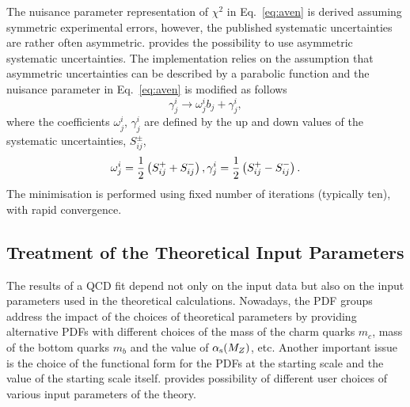 %
The nuisance parameter representation of $\chi^2$ in Eq.~\ref{eq:aven} is derived assuming 
symmetric experimental errors, however, the published systematic uncertainties are 
rather often asymmetric.
\fitter provides the possibility to use asymmetric systematic uncertainties.
The implementation relies on the assumption that 
asymmetric uncertainties can be described by a parabolic function
and the nuisance parameter in Eq.~\ref{eq:aven} is modified as follows
\begin{equation}
  \gamma^i_{j} \to \omega^i_{j}b_j + \gamma^i_{j},
\end{equation}
where the coefficients $\omega^i_{j}$, $\gamma^i_{j}$ are defined  
by the up and down values of the systematic uncertainties,
$S_{ij}^{\pm}$,
\begin{equation}
  \omega^i_{j}=\frac{1}{2}\left(S_{ij}^{+}+S_{ij}^{-}\right), \\
  \gamma^i_{j}=\frac{1}{2}\left(S_{ij}^{+}-S_{ij}^{-}\right). 
\end{equation}
The minimisation is performed using fixed number of iterations (typically ten), with rapid convergence.





\subsection{Treatment of the Theoretical Input Parameters}

The results of a QCD fit depend not only on the input data but also on the 
input parameters used in the theoretical calculations. Nowadays, the PDF groups 
address the impact of the choices of theoretical parameters by providing
alternative PDFs with different choices of the mass of the charm quarks $m_c$, 
mass of the bottom quarks $m_b$ and the value of $\alpha_\mathrm{s}(M_Z)$, etc. 
Another important issue is the choice of the functional form for the PDFs at the 
starting scale and the value of the starting scale itself. \fitter provides 
possibility of different user choices of various input parameters of the theory.

